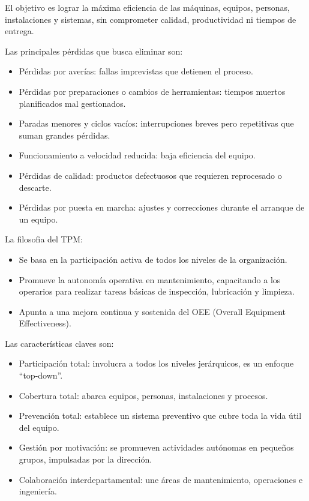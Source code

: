 \documentclass[a4paper,oneside,11pt]{article}
\begin{document}
\begin{enumerate}
    El objetivo es lograr la máxima eficiencia de las máquinas, equipos, personas, instalaciones y sistemas, sin comprometer calidad, productividad ni tiempos de entrega. 

    Las principales pérdidas que busca eliminar son: 
    \begin{itemize}
        \item Pérdidas por averías: fallas imprevistas que detienen el proceso.
        \item Pérdidas por preparaciones o cambios de herramientas: tiempos muertos planificados mal gestionados.
        \item Paradas menores y ciclos vacíos: interrupciones breves pero repetitivas que suman grandes pérdidas.
        \item Funcionamiento a velocidad reducida: baja eficiencia del equipo.
        \item Pérdidas de calidad: productos defectuosos que requieren reprocesado o descarte.
        \item Pérdidas por puesta en marcha: ajustes y correcciones durante el arranque de un equipo.
    \end{itemize}

    La filosofia del TPM:
    \begin{itemize}
        \item Se basa en la participación activa de todos los niveles de la organización.
        \item Promueve la autonomía operativa en mantenimiento, capacitando a los operarios para realizar tareas básicas de inspección, lubricación y limpieza.
        \item Apunta a una mejora continua y sostenida del OEE (Overall Equipment Effectiveness).
    \end{itemize}

    Las características claves son:
    \begin{itemize}
        \item Participación total: involucra a todos los niveles jerárquicos, es un enfoque “top-down”.
        \item Cobertura total: abarca equipos, personas, instalaciones y procesos.
        \item Prevención total: establece un sistema preventivo que cubre toda la vida útil del equipo.
        \item Gestión por motivación: se promueven actividades autónomas en pequeños grupos, impulsadas por la dirección.
        \item Colaboración interdepartamental: une áreas de mantenimiento, operaciones e ingeniería.
    \end{itemize}


\end{enumerate}
\end{document}
